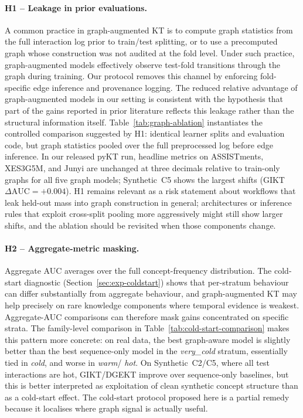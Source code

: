 \documentclass[runningheads]{llncs}
\newcommand{\KCs}{knowledge components}
\begin{document}
\paragraph{H1 -- Leakage in prior evaluations.}
A common practice in graph-augmented KT is to compute graph statistics
from the full interaction log prior to train/test splitting, or to use
a precomputed graph whose construction was not audited at the fold
level. Under such practice, graph-augmented models effectively observe
test-fold transitions through the graph during training. Our protocol
removes this channel by enforcing fold-specific edge inference and
provenance logging. The reduced relative advantage of graph-augmented
models in our setting is consistent with the hypothesis that part of
the gains reported in prior literature reflects this leakage rather
than the structural information itself.
Table~\ref{tab:graph-ablation} instantiates the controlled comparison suggested by H1:
identical learner splits and evaluation code, but graph statistics pooled over the full
preprocessed log before edge inference.
In our released pyKT run, headline metrics on ASSISTments, XES3G5M, and Junyi are
unchanged at three decimals relative to train-only graphs for all five graph models;
Synthetic~C5 shows the largest shifts (GIKT $\Delta\text{AUC}{=}{+}0.004$).
H1 remains relevant as a risk statement about workflows that leak held-out mass into
graph construction in general; architectures or inference rules that exploit
cross-split pooling more aggressively might still show larger shifts, and the ablation
should be revisited when those components change.

\paragraph{H2 -- Aggregate-metric masking.}
Aggregate AUC averages over the full concept-frequency distribution.
The cold-start diagnostic (Section~\ref{sec:exp-coldstart}) shows that
per-stratum behaviour can differ substantially from aggregate
behaviour, and graph-augmented KT may help precisely on rare \KCs{}
where temporal evidence is weakest. Aggregate-AUC comparisons can
therefore mask gains concentrated on specific strata. The family-level
comparison in Table~\ref{tab:cold-start-comparison} makes this pattern
more concrete: on real data, the best graph-aware model is slightly
better than the best sequence-only model in the \emph{very\_cold}
stratum, essentially tied in \emph{cold}, and worse in \emph{warm}/
\emph{hot}. On Synthetic~C2/C5, where all test interactions are hot,
GIKT/DGEKT improve over sequence-only baselines, but this is better
interpreted as exploitation of clean synthetic concept structure than
as a cold-start effect. The cold-start protocol proposed here is a
partial remedy because it localises where graph signal is actually
useful.
\end{document}
